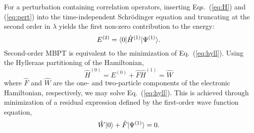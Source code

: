 For a perturbation containing correlation operators, inserting
Eqs.~(\ref{eq:H}) and (\ref{eq:pert}) into the time-independent Schr\"odinger
equation and truncating at the second order in $\lambda$ yields the first
non-zero contribution to the energy:\cite{Szabo1996} \begin{equation}
\label{eq:hyll}
    E^{(2)} = \langle0 |\hat{H}^{(1)}| \Psi^{(1)} \rangle.
\end{equation} Second-order MBPT is equivalent to the minimization
of Eq.~(\ref{eq:hyll}). Using the Hylleraas partitioning of the
Hamiltonian,\cite{Pulay1986b} \begin{subequations}
    \begin{equation}
        \hat{H}^{(0)} = E^{(0)} + \hat{F}
    \end{equation} \begin{equation}
        \hat{H}^{(1)} = \hat{W}
    \end{equation}
\end{subequations} where $\hat{F}$ and $\hat{W}$ are the one- and
two-particle components of the electronic Hamiltonian, respectively, 
we may solve Eq.~(\ref{eq:hyll}).
This is achieved
through minimization of a residual expression defined by the first-order
wave function equation, 
\begin{equation} \label{eq:mp2_res}
    \hat{W}| 0 \rangle + \hat{F}| \Psi^{(1)} \rangle = 0.
\end{equation} 

